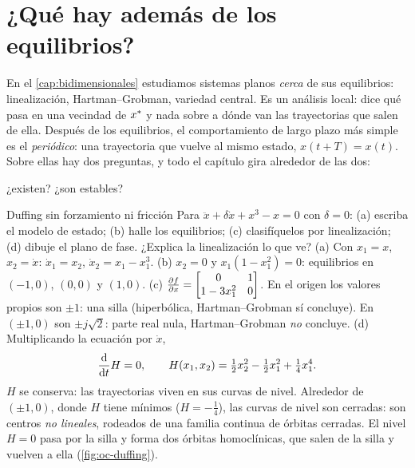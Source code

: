 \section{¿Qué hay además de los equilibrios?}
\label{sec:oc-masalla}

En el \cref{cap:bidimensionales} estudiamos sistemas planos \emph{cerca} de sus equilibrios: linealización, Hartman--Grobman, variedad central. Es un análisis local: dice qué pasa en una vecindad de $x^{*}$ y nada sobre a dónde van las trayectorias que salen de ella. Después de los equilibrios, el comportamiento de largo plazo más simple es el \emph{periódico}: una trayectoria que vuelve al mismo estado, $x(t+T)=x(t)$. Sobre ellas hay dos preguntas, y todo el capítulo gira alrededor de las dos:
\begin{center}
\sffamily\large\color{snlazul}¿existen? \qquad ¿son estables?
\end{center}

\begin{ejemplo}[label=ej:oc-duffing]{Duffing sin forzamiento ni fricción}
Para $\ddot x+\delta\dot x+x^3-x=0$ con $\delta=0$: (a) escriba el modelo de estado; (b) halle los equilibrios; (c) clasifíquelos por linealización; (d) dibuje el plano de fase. ¿Explica la linealización lo que ve?
\solucion (a) Con $x_1=x$, $x_2=\dot x$: $\dot x_1=x_2$, $\dot x_2=x_1-x_1^3$. (b) $x_2=0$ y $x_1(1-x_1^2)=0$: equilibrios en $(-1,0)$, $(0,0)$ y $(1,0)$. (c) $\frac{\partial f}{\partial x}=\begin{bmatrix}0&1\\1-3x_1^2&0\end{bmatrix}$. En el origen los valores propios son $\pm1$: una silla (hiperbólica, Hartman--Grobman sí concluye). En $(\pm1,0)$ son $\pm j\sqrt2$: parte real nula, Hartman--Grobman \emph{no} concluye. (d) Multiplicando la ecuación por $\dot x$,
\[
  \frac{\mathrm{d}}{\mathrm{d} t}H=0,\qquad H(x_1,x_2)=\tfrac12x_2^2-\tfrac12x_1^2+\tfrac14x_1^4 .
\]
$H$ se conserva: las trayectorias viven en sus curvas de nivel. Alrededor de $(\pm1,0)$, donde $H$ tiene mínimos ($H=-\tfrac14$), las curvas de nivel son cerradas: son centros \emph{no lineales}, rodeados de una familia continua de órbitas cerradas. El nivel $H=0$ pasa por la silla y forma dos órbitas homoclínicas, que salen de la silla y vuelven a ella (\cref{fig:oc-duffing}).
\end{ejemplo}

